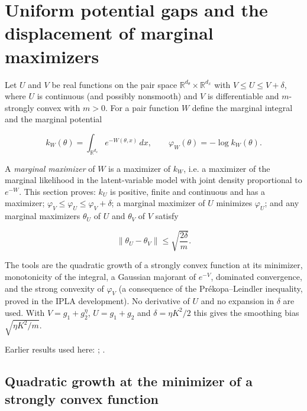 \documentclass[11pt,a4paper]{report}
\begin{document}
\section{\texorpdfstring{Uniform potential gaps and the displacement of marginal maximizers}{Uniform potential gaps and the displacement of marginal maximizers}}
\label{proof-module-ProximalLangevin-Perturbation-lean}


Let \(U\) and \(V\) be real functions on the pair space \(\mathbb R^{d_\theta}\times\mathbb R^{d_x}\) with \(V\le U\le V+\delta\), where \(U\) is continuous (and possibly nonsmooth) and \(V\) is differentiable and \(m\)-strongly convex with \(m>0\). For a pair function \(W\) define the marginal integral and the marginal potential


\[k_W(\theta)=\int_{\mathbb R^{d_x}}e^{-W(\theta,x)}\,dx,\qquad\varphi_W(\theta)=-\log k_W(\theta).\]


A \emph{marginal maximizer} of \(W\) is a maximizer of \(k_W\), i.e. a maximizer of the marginal likelihood in the latent-variable model with joint density proportional to \(e^{-W}\). This section proves: \(k_U\) is positive, finite and continuous and has a maximizer; \(\varphi_V\le\varphi_U\le\varphi_V+\delta\); a marginal maximizer of \(U\) minimizes \(\varphi_U\); and any marginal maximizers \(\theta_U\) of \(U\) and \(\theta_V\) of \(V\) satisfy


\[\|\theta_U-\theta_V\|\le\sqrt{\frac{2\delta}{m}} .\]


The tools are the quadratic growth of a strongly convex function at its minimizer, monotonicity of the integral, a Gaussian majorant of \(e^{-V}\), dominated convergence, and the strong convexity of \(\varphi_V\) (a consequence of the Prékopa–Leindler inequality, proved in the IPLA development). No derivative of \(U\) and no expansion in \(\delta\) are used. With \(V=g_1+g_2^\eta\), \(U=g_1+g_2\) and \(\delta=\eta K^2/2\) this gives the smoothing bias \(\sqrt{\eta K^2/m}\).



Earlier results used here: \cite[Section~3.12]{LangevinLean2026IPLA}; \cite[Section~3.49]{LangevinLean2026ULASC}.
\subsection{\texorpdfstring{Quadratic growth at the minimizer of a strongly convex function}{Quadratic growth at the minimizer of a strongly convex function}}
\label{report-step-ProximalLangevin-Perturbation-lean-1}
\end{document}

